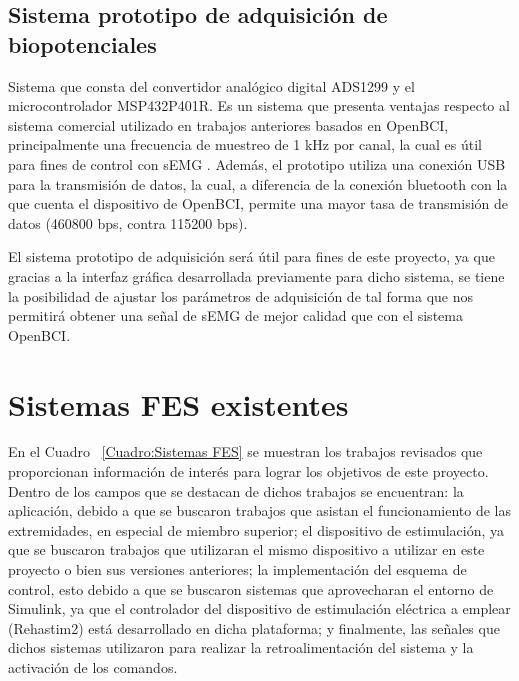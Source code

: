 \subsection{Sistema prototipo de adquisición de biopotenciales}
Sistema que consta del convertidor analógico digital ADS1299 y el microcontrolador MSP432P401R. Es un sistema que presenta ventajas respecto al sistema comercial utilizado en trabajos anteriores basados en OpenBCI, principalmente una frecuencia de muestreo de 1 kHz por canal, la cual es útil para fines de control con sEMG \cite{Lenzi2012}\cite{Lenzi2011}\cite{Raafat}. Además, el prototipo utiliza una conexión USB para la transmisión de datos, la cual, a diferencia de la conexión bluetooth con la que cuenta el dispositivo de OpenBCI, permite una mayor tasa de transmisión de datos (460800 bps, contra 115200 bps). %

El sistema prototipo de adquisición será útil para fines de este proyecto, ya que gracias a la interfaz gráfica desarrollada previamente para dicho sistema, se tiene la posibilidad de ajustar los parámetros de adquisición de tal forma que nos permitirá obtener una señal de sEMG de mejor calidad que con el sistema OpenBCI.

\section{Sistemas FES existentes}
En el Cuadro ~\ref{Cuadro:Sistemas FES} se muestran los trabajos revisados que proporcionan información de interés para lograr los objetivos de este proyecto. Dentro de los campos que se destacan de dichos trabajos se encuentran: la aplicación, debido a que se buscaron trabajos que asistan el funcionamiento de las extremidades, en especial de miembro superior; el dispositivo de estimulación, ya que se buscaron trabajos que utilizaran el mismo dispositivo a utilizar en este proyecto o bien sus versiones anteriores; la implementación del esquema de control, esto debido a que se buscaron sistemas que aprovecharan el entorno de Simulink, ya que el controlador del dispositivo de estimulación eléctrica a emplear (Rehastim2) está desarrollado en dicha plataforma; y finalmente, las señales que dichos sistemas utilizaron para realizar la retroalimentación del sistema y la activación de los comandos.

